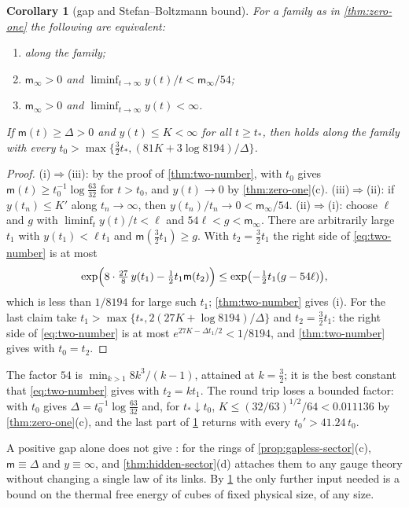 \documentclass[11pt,a4paper]{amsart}
\newtheorem{corollary}[theorem]{Corollary}
\theoremstyle{definition}
\theoremstyle{remark}
\numberwithin{equation}{section}
\newcommand{\Mcirc}{\text{\upshape(M$^{\circ}$)}}   %
\newcommand{\tzero}{t_0}                   %
\begin{document}
\begin{corollary}[gap and Stefan--Boltzmann bound]\label{cor:gap-sb}
For a family as in \cref{thm:zero-one} the following are equivalent:
\begin{enumerate}[label=\textup{(\roman*)},leftmargin=*]
\item \Mcirc{} along the family;
\item $\mathsf m_\infty>0$ and $\liminf_{t\to\infty}y(t)/t<\mathsf m_\infty/54$;
\item $\mathsf m_\infty>0$ and $\liminf_{t\to\infty}y(t)<\infty$.
\end{enumerate}
If $\mathsf m(t)\ge\Delta>0$ and $y(t)\le K<\infty$ for all $t\ge t_*$, then \Mcirc{} holds along the family with every $\tzero>\max\{\frac32t_*,(81K+3\log8194)/\Delta\}$.
\end{corollary}

\begin{proof}
(i)$\Rightarrow$(iii): by the proof of \cref{thm:two-number}, \Mcirc{} with $\tzero$ gives $\mathsf m(t)\ge\tzero^{-1}\log\frac{63}{32}$ for $t>\tzero$, and $y(t)\to0$ by \cref{thm:zero-one}\textup{(c)}. (iii)$\Rightarrow$(ii): if $y(t_n)\le K'$ along $t_n\to\infty$, then $y(t_n)/t_n\to0<\mathsf m_\infty/54$. (ii)$\Rightarrow$(i): choose $\ell$ and $g$ with $\liminf_ty(t)/t<\ell$ and $54\ell<g<\mathsf m_\infty$. There are arbitrarily large $t_1$ with $y(t_1)<\ell t_1$ and $\mathsf m(\frac32t_1)\ge g$. With $t_2=\frac32t_1$ the right side of \eqref{eq:two-number} is at most
\[
\exp\Bigl(8\cdot\tfrac{27}8\,y(t_1)-\tfrac12t_1\mathsf m(t_2)\Bigr)\le\exp\bigl(-\tfrac12t_1(g-54\ell)\bigr),
\]
which is less than $1/8194$ for large such $t_1$; \cref{thm:two-number} gives (i). For the last claim take $t_1>\max\{t_*,2(27K+\log8194)/\Delta\}$ and $t_2=\frac32t_1$: the right side of \eqref{eq:two-number} is at most $e^{27K-\Delta t_1/2}<1/8194$, and \cref{thm:two-number} gives \Mcirc{} with $\tzero=t_2$.
\end{proof}

The factor $54$ is $\min_{k>1}8k^3/(k-1)$, attained at $k=\frac32$; it is the best constant that \eqref{eq:two-number} gives with $t_2=kt_1$. The round trip loses a bounded factor: \Mcirc{} with $\tzero$ gives $\Delta=\tzero^{-1}\log\frac{63}{32}$ and, for $t_*\downarrow\tzero$, $K\le(32/63)^{1/2}/64<0.011136$ by \cref{thm:zero-one}\textup{(c)}, and the last part of \cref{cor:gap-sb} returns \Mcirc{} with every $\tzero'>41.24\,\tzero$.

A positive gap alone does not give \Mcirc{}: for the rings of \cref{prop:gapless-sector}\textup{(c)}, $\mathsf m\equiv\Delta$ and $y\equiv\infty$, and \cref{thm:hidden-sector}\textup{(d)} attaches them to any gauge theory without changing a single law of its links. By \cref{cor:gap-sb} the only further input needed is a bound on the thermal free energy of cubes of fixed physical size, of any size.
\end{document}
